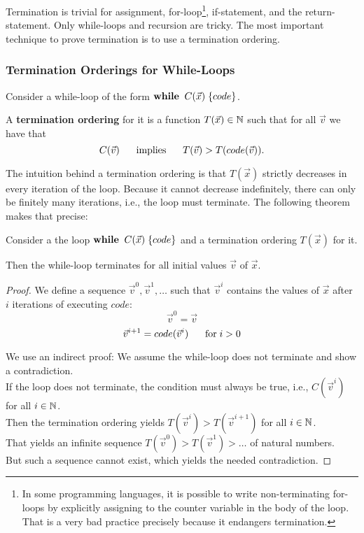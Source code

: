 Termination is trivial for assignment, for-loop\footnote{In some programming languages, it is possible to write non-terminating for-loops by explicitly assigning to the counter variable in the body of the loop. That is a very bad practice precisely because it endangers termination.}, if-statement, and the return-statement.
Only while-loops and recursion are tricky.
The most important technique to prove termination is to use a termination ordering.

\subsubsection{Termination Orderings for While-Loops}

\begin{definition}\label{sec:def:termord}
Consider a while-loop of the form $\awhileI{C(\vec{x})}{code}$.

A \textbf{termination ordering} for it is a function $T(\vec{x})\in\mathbb{N}$ such that for all $\vec{v}$ we have that
\[C(\vec{v}) \hspace*{.5cm}\;\mathrm{implies}\;\hspace*{.5cm} T(\vec{v})>T(code(\vec{v})).\]
\end{definition}

The intuition behind a termination ordering is that $T(\vec{x})$ strictly decreases in every iteration of the loop.
Because it cannot decrease indefinitely, there can only be finitely many iterations, i.e., the loop must terminate.
The following theorem makes that precise:

\begin{theorem}\label{sec:thm:termord}
Consider a the loop $\awhileI{C(\vec{x})}{code}$ and a termination ordering $T(\vec{x})$ for it.

Then the while-loop terminates for all initial values $\vec{v}$ of $\vec{x}$.
\end{theorem}
\begin{proof}
We define a sequence $\vec{v}^0, \vec{v}^1, \ldots$ such that $\vec{v}^i$ contains the values of $\vec{x}$ after $i$ iterations of executing $code$:
\[\vec{v}^0=\vec{v}\]
\[\vec{v}^{i+1}=code(\vec{v}^i) \hspace*{.5cm} \;\mathrm{for}\; i>0\]
\medskip

We use an indirect proof: We assume the while-loop does not terminate and show a contradiction.\\
If the loop does not terminate, the condition must always be true, i.e., $C(\vec{v}^i)$ for all $i\in\mathbb{N}$.\\
Then the termination ordering yields $T(\vec{v}^i)>T(\vec{v}^{i+1})$ for all $i\in\mathbb{N}$.\\
That yields an infinite sequence $T(\vec{v}^0) > T(\vec{v}^1) > \ldots $ of natural numbers.\\
But such a sequence cannot exist, which yields the needed contradiction.
\end{proof}


